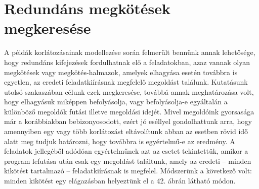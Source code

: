 \documentclass[12pt,a4paper,twoside, openright]{report}
\begin{document}
\chapter{Redundáns megkötések megkeresése}

    A példák korlátozásainak modellezése során felmerült bennünk annak lehetősége, hogy redundáns kifejezések fordulhatnak elő a feladatokban, azaz vannak olyan megkötések vagy megkötés-halmazok, amelyek elhagyása esetén továbbra is egyetlen, az eredeti feladatkiírásnak megfelelő megoldást találunk.
    Kutatásunk utolsó szakaszában célunk ezek megkeresése, továbbá annak meghatározása volt, hogy elhagyásuk miképpen befolyásolja, vagy befolyásolja-e egyáltalán a különböző megoldók futási illetve megoldási idejét.
    Mivel megoldóink gyorsasága már a korábbiakban bebizonyosodott, ezért jó eséllyel gondolhattunk arra, hogy amennyiben egy vagy több korlátozást eltávolítunk abban az esetben rövid idő alatt meg tudjuk határozni, hogy továbbra is egyértelmű-e az eredmény.
    A feladatok jellegéből adódóan egyértelműnek azt az esetet tekintettük, amikor a program lefutása után csak egy megoldást találtunk, amely az eredeti – minden kikötést tartalmazó – feladatkiírásnak is megfelel.
    Módszerünk a következő volt: minden kikötést egy elágazásban helyeztünk el a 42. ábrán látható módon.

\end{document}
